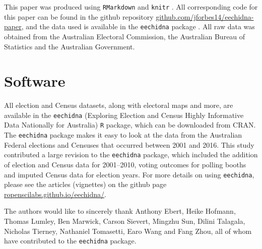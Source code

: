 \documentclass[times, doublespace]{anzsauth}
\begin{document}
This paper was produced using \texttt{RMarkdown} \citep{rmarkdown} and \texttt{knitr} \citep{knitr}. All corresponding code for this paper can be found in the github repository \href{https://github.com/jforbes14/eechidna-paper}{github.com/jforbes14/eechidna-paper}, and the data used is available in the \texttt{eechidna} package \citep{eechidna}. All raw data was obtained from the Australian Electoral Commission, the Australian Bureau of Statistics and the Australian Government.

\hypertarget{software}{%
\section{Software}\label{software}}

All election and Census datasets, along with electoral maps and more, are available in the \texttt{eechidna} (Exploring Election and Census Highly Informative Data Nationally for Australia) \texttt{R} package, which can be downloaded from CRAN. The \texttt{eechidna} package makes it easy to look at the data from the Australian Federal elections and Censuses that occurred between 2001 and 2016. This study contributed a large revision to the \texttt{eechidna} package, which included the addition of election and Census data for 2001--2010, voting outcomes for polling booths and imputed Census data for election years. For more details on using \texttt{eechidna}, please see the articles (vignettes) on the github page \href{https://ropenscilabs.github.io/eechidna/}{ropenscilabs.github.io/eechidna/}.

The authors would like to sincerely thank Anthony Ebert, Heike Hofmann, Thomas Lumley, Ben Marwick, Carson Sievert, Mingzhu Sun, Dilini Talagala, Nicholas Tierney, Nathaniel Tomasetti, Earo Wang and Fang Zhou, all of whom have contributed to the \texttt{eechidna} package.

\renewcommand\refname{References}

\end{document}
